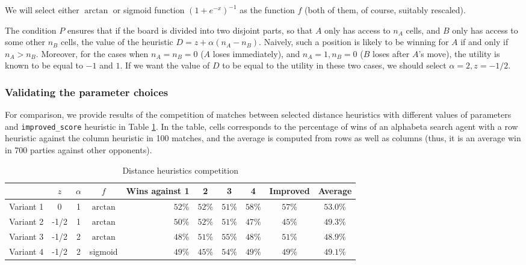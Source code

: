 \documentclass[oneside]{article}   	%
\begin{document}
We will select either $\arctan$ or sigmoid function $(1+e^{-x})^{-1}$ as the function $f$ (both of them, of course, suitably rescaled). 

The condition $P$ ensures that if the board is divided into two disjoint parts, so that $A$ only has access to $n_A$ cells, and $B$ only has access to some other $n_B$ cells, the value of the heuristic $D = z+\alpha(n_A-n_B)$. Naively, such a position is likely to be winning for $A$ if and only if $n_A > n_B$. Moreover, for the cases when $n_A=n_B=0$ ($A$ loses immediately), and $n_A=1, n_B=0$ ($B$ loses after $A$'s move), the utility is known to be equal to $-1$ and $1$. If we want the value of $D$ to be equal to the utility in these two cases, we should select $\alpha = 2, z = -1/2$.

\subsubsection{Validating the parameter choices}
\label{distancechoices}

For comparison, we provide results of the competition of matches between selected distance heuristics with different values of parameters and \texttt{improved\_score} heuristic in Table \ref{DistanceCompetition}. In the table, cells corresponds to the percentage of wins of an alphabeta search agent with a row heuristic against the column heuristic in 100 matches, and the average is computed from rows as well as columns (thus, it is an average win in 700 parties against other opponents).

\begin{table}[htp]
\caption{Distance heuristics competition}
\begin{center}
\begin{tabular}{c|ccc|rcccc|c}
   & $z$ & $\alpha$ & $f$ & Wins against 1 & 2 & 3 & 4 & Improved & Average \\
   \hline
 Variant 1 &    0 & 1 & $\arctan$  & $52\%$ & $52\%$ & $51\%$ & $58\%$ & $57\%$ & $53.0\%$ \\
 Variant 2 & -1/2 & 1 & $\arctan$  & $50\%$ & $52\%$ & $51\%$ & $47\%$ & $45\%$ & $49.3\%$ \\
 Variant 3 & -1/2 & 2 & $\arctan$  & $48\%$ & $51\%$ & $55\%$ & $48\%$ & $51\%$ & $48.9\%$ \\
 Variant 4 & -1/2 & 2 & sigmoid    & $49\%$ & $45\%$ & $54\%$ & $49\%$ & $49\%$ & $49.1\%$
 
\end{tabular}
\end{center}
\label{DistanceCompetition}
\end{table}%
\end{document}
